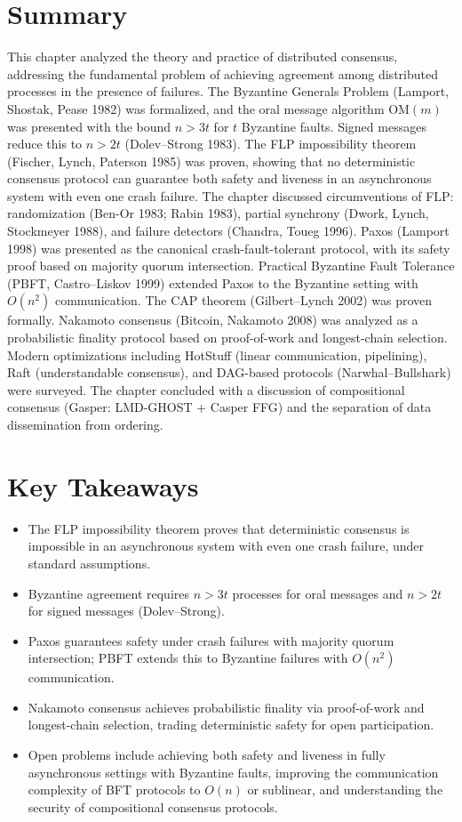 \section{Summary}
\label{sec:consensus:summary}

This chapter analyzed the theory and practice of distributed consensus, addressing the fundamental problem of achieving agreement among distributed processes in the presence of failures. The Byzantine Generals Problem (Lamport, Shostak, Pease 1982) was formalized, and the oral message algorithm $\text{OM}(m)$ was presented with the bound $n > 3t$ for $t$ Byzantine faults. Signed messages reduce this to $n > 2t$ (Dolev--Strong 1983). The FLP impossibility theorem (Fischer, Lynch, Paterson 1985) was proven, showing that no deterministic consensus protocol can guarantee both safety and liveness in an asynchronous system with even one crash failure. The chapter discussed circumventions of FLP: randomization (Ben-Or 1983; Rabin 1983), partial synchrony (Dwork, Lynch, Stockmeyer 1988), and failure detectors (Chandra, Toueg 1996). Paxos (Lamport 1998) was presented as the canonical crash-fault-tolerant protocol, with its safety proof based on majority quorum intersection. Practical Byzantine Fault Tolerance (PBFT, Castro--Liskov 1999) extended Paxos to the Byzantine setting with $O(n^2)$ communication. The CAP theorem (Gilbert--Lynch 2002) was proven formally. Nakamoto consensus (Bitcoin, Nakamoto 2008) was analyzed as a probabilistic finality protocol based on proof-of-work and longest-chain selection. Modern optimizations including HotStuff (linear communication, pipelining), Raft (understandable consensus), and DAG-based protocols (Narwhal--Bullshark) were surveyed. The chapter concluded with a discussion of compositional consensus (Gasper: LMD-GHOST + Casper FFG) and the separation of data dissemination from ordering.

\section*{Key Takeaways}
\begin{itemize}
\item The FLP impossibility theorem proves that deterministic consensus is impossible in an asynchronous system with even one crash failure, under standard assumptions.
\item Byzantine agreement requires $n > 3t$ processes for oral messages and $n > 2t$ for signed messages (Dolev--Strong).
\item Paxos guarantees safety under crash failures with majority quorum intersection; PBFT extends this to Byzantine failures with $O(n^2)$ communication.
\item Nakamoto consensus achieves probabilistic finality via proof-of-work and longest-chain selection, trading deterministic safety for open participation.
\item Open problems include achieving both safety and liveness in fully asynchronous settings with Byzantine faults, improving the communication complexity of BFT protocols to $O(n)$ or sublinear, and understanding the security of compositional consensus protocols.
\end{itemize}

